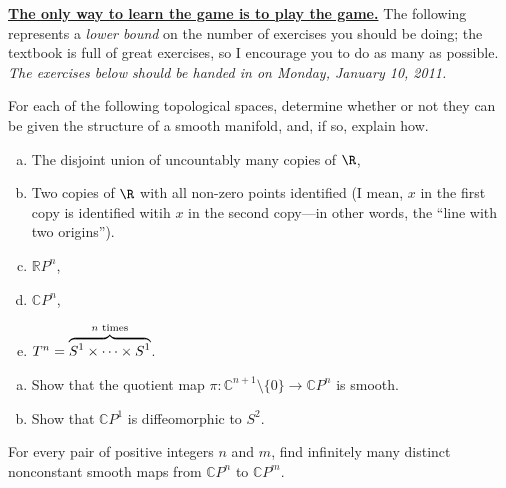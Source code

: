 \documentclass[12pt]{pset}
\author{Jim Fowler}
\date{Winter 2011}
\newcommand{\CC}{\mathbb{C}}
\newcommand{\CP}{\mathbb{C}P}
\newcommand{\RP}{\mathbb{R}P}
\begin{document}
\maketitle

\noindent\textbf{\href{http://en.wikipedia.org/wiki/List_of_games_with_concealed_rules}{The only way to learn the game is to play the game.}}
The following represents a \textit{lower bound} on the number of
exercises you should be doing; the textbook is full of great
exercises, so I encourage you to do as many as possible.
\textit{The exercises below should be handed in on Monday, January 10, 2011.}

\begin{problem}
  For each of the following topological spaces, determine whether or
  not they can be given the structure of a smooth manifold, and, if so,
  explain how.
\begin{enumerate}[(a)]
\item The disjoint union of uncountably many copies of $\R$,
\item Two copies of $\R$ with all non-zero points identified (I mean,
  $x$ in the first copy is identified witih $x$ in the second
  copy---in other words, the ``line with two origins'').
\item $\RP^n$,
\item $\CP^n$,
\item $T^n = \overbrace{S^1 \times \cdots \times
    S^1}^{\mbox{\scriptsize $n$ times}}$.
\end{enumerate}
\end{problem}

\begin{problem}[Lee 2--10]
  \begin{enumerate}[(a)]
  \item Show that the quotient map $\pi : \CC^{n+1} \setminus \{0\} \to
    \CP^n$ is smooth.
  \item Show that $\CP^1$ is diffeomorphic to $S^2$.
  \end{enumerate}
\end{problem}

\begin{problem}
  For every pair of positive integers $n$ and $m$, find infinitely
  many distinct nonconstant smooth maps from $\CP^n$ to $\CP^m$.
\end{problem}
\end{document}
